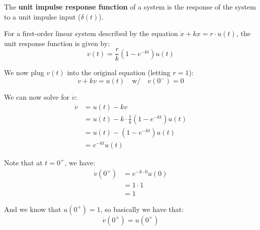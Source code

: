 {
    The \textbf{unit impulse response function} of a system is the response of the system to a unit impulse input ($\delta(t)$).
}

 For a first-order linear system described by the equation $\dot{x} + kx = r \cdot u(t)$, the unit response function is given by:
\begin{equation*}
\boxed{
v(t) = \frac{r}{k} (1 - e^{-kt}) u(t)
}
\end{equation*}

We now plug $v(t)$ into the original equation (letting $r = 1$):
\[
\dot{v} + kv = u(t) \quad \text{w/} \quad v(0^-) = 0
\]

We can now solve for $\dot{v}$:
\begin{align*}
\dot{v} &= u(t) - kv \\
&= u(t) - k \cdot \frac{1}{k} (1 - e^{-kt}) u(t) \\
&= u(t) - (1 - e^{-kt}) u(t) \\
&= e^{-kt} u(t)
\end{align*}

Note that at $t = 0^+$, we have:
\begin{align*}
\dot{v}(0^+) &= e^{-k \cdot 0} u(0) \\
&= 1 \cdot 1 \\
&= 1
\end{align*}

And we know that $u(0^+) = 1$, so basically we have that:
\begin{equation*}
\boxed{
\dot{v}(0^+) = u(0^+)}
\end{equation*}

